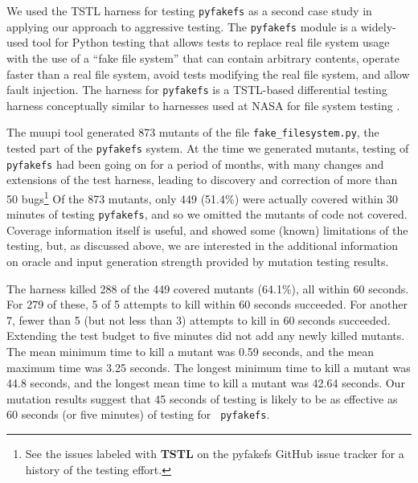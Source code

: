 \documentclass{svjour3}
\begin{document}
We used the TSTL \cite{NFM15,ISSTA15,tstlsttt,tstl} harness for
testing {\tt pyfakefs} \cite{pyfakefs} as a second case study in applying our approach
to aggressive testing.  The {\tt pyfakefs} module is a widely-used
tool for Python testing that allows tests to replace real file system
usage with the use of a ``fake file system'' that can contain
arbitrary contents, operate faster than a real file system, avoid
tests modifying the real file system, and allow fault injection.  The
harness for {\tt pyfakefs} is a TSTL-based differential testing
harness conceptually similar to harnesses used at NASA for file system
testing \cite{ICSEDiff,CFV08}.

The muupi \cite{muupi} tool generated 873
mutants of the file {\tt fake\_filesystem.py}, the tested part of the
{\tt pyfakefs} system.  At the time we generated mutants, testing of
{\tt pyfakefs} had been going on for a period of months, with many
changes and extensions of the test harness, leading to discovery and
correction of more than 50 bugs\footnote{See the issues labeled with
  {\bf TSTL} on the pyfakefs GitHub issue tracker for a history of the
  testing effort.}  Of the 873 mutants, only 449 (51.4\%) were actually covered
within 30 minutes of testing {\tt pyfakefs}, and so we omitted the
mutants of code not covered.  Coverage information itself is useful,
and showed some (known) limitations of the testing, but, as discussed
above, we are interested in the additional information on oracle and
input generation strength provided by mutation testing results.

The harness killed 288 of the 449 covered mutants (64.1\%), all within 60
seconds.  For 279 of these, 5 of 5 attempts to kill within 60 seconds
succeeded.  For another 7, fewer than 5 (but not less than 3) attempts
to kill in 60 seconds succeeded.  Extending the test budget to five
minutes did not add any newly killed mutants.  The mean minimum time
to kill a mutant was 0.59 seconds, and the mean maximum time was 3.25
seconds.  The longest minimum time to kill a mutant was 44.8 seconds,
and the longest mean time to kill a mutant was 42.64 seconds.
Our mutation results suggest that 45 seconds of testing is likely to
be as effective as 60 seconds (or five minutes) of testing for {\tt
  pyfakefs}.
\end{document}
